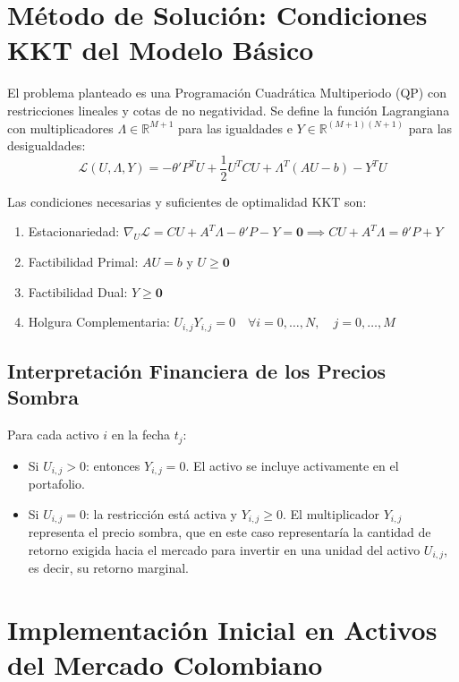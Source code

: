 \documentclass[11pt,a4paper]{article}
\begin{document}
\section{Método de Solución: Condiciones KKT del Modelo Básico}
El problema planteado es una Programación Cuadrática Multiperiodo (QP) con restricciones lineales y cotas de no negatividad. Se define la función Lagrangiana con multiplicadores $\Lambda \in \mathbb{R}^{M+1}$ para las igualdades e $Y \in \mathbb{R}^{(M+1)(N+1)}$ para las desigualdades:
\begin{equation}
    \mathcal{L}(U, \Lambda, Y) = -\theta' P^T U + \frac{1}{2} U^T C U + \Lambda^T (AU - b) - Y^T U
\end{equation}

Las condiciones necesarias y suficientes de optimalidad KKT son:
\begin{enumerate}
    \item Estacionariedad: $\nabla_U \mathcal{L} = CU + A^T \Lambda - \theta' P - Y = \mathbf{0} \implies CU + A^T \Lambda = \theta' P + Y$
    \item Factibilidad Primal: $AU = b$ y $U \ge \mathbf{0}$
    \item Factibilidad Dual: $Y \ge \mathbf{0}$
    \item Holgura Complementaria: $U_{i,j} Y_{i,j} = 0 \quad \forall i = 0, \dots, N, \quad j = 0, \dots, M$
\end{enumerate}

\subsection{Interpretación Financiera de los Precios Sombra}
Para cada activo $i$ en la fecha $t_j$:
\begin{itemize}
    \item Si $U_{i,j} > 0$: entonces $Y_{i,j} = 0$. El activo se incluye activamente en el portafolio.
    \item Si $U_{i,j} = 0$: la restricción está activa y $Y_{i,j} \ge 0$. El multiplicador $Y_{i,j}$ representa el precio sombra, que en este caso representaría la cantidad de retorno exigida hacia el mercado para invertir en una unidad del activo $U_{i,j}$, es decir, su retorno marginal.
\end{itemize}

\section{Implementación Inicial en Activos del Mercado Colombiano}
\end{document}
